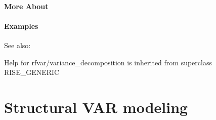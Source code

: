 \documentclass[letterpaper,10pt,english]{sphinxmanual}
\begin{document}
\subsubsection{More About}
\label{classes/models/@rfvar/rfvar:id160}

\subsubsection{Examples}
\label{classes/models/@rfvar/rfvar:id161}
See also:

Help for rfvar/variance\_decomposition is inherited from superclass RISE\_GENERIC


\chapter{Structural VAR modeling}
\label{classes/models/@svar/svar:structural-var-modeling}\label{classes/models/@svar/svar::doc}
\end{document}
